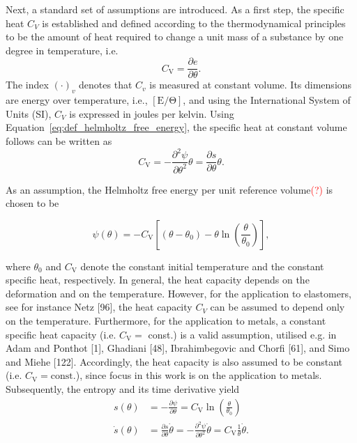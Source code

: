 Next, a standard set of assumptions are introduced.
As a first step, the specific heat \(C_{V}\) is established and defined according to the thermodynamical principles to be the amount of heat required to change a unit mass of a substance by one degree in temperature, i.e.
\begin{equation}
C_{\mathrm{V}}=\frac{\partial e}{\partial \theta}.
\end{equation}
The index \((\cdot)_{v}\) denotes that \(C_{v}\) is measured at constant volume.
Its dimensions are energy over temperature, i.e., \(\mathrm{[E/\Theta]}\), and using the International System of Units (SI), \(C_{V}\) is expressed in joules per kelvin.
Using Equation~\ref{eq:def_helmholtz_free_energy}, the specific heat at constant volume follows can be written as
\begin{equation}
C_{\mathrm{V}}=-\frac{\partial^{2} \psi}{\partial \theta^{2}} \theta=\frac{\partial s}{\partial \theta} \theta.
\end{equation}

As an assumption, the Helmholtz free energy per unit reference volume\textcolor{red}{(?)} is chosen to be
\begin{highlight}
\begin{equation}
\psi(\theta)=- C_{\mathrm{V}}\left[\left(\theta-\theta_{0}\right)-\theta \ln \left(\frac{\theta}{\theta_{0}}\right)\right],
\end{equation}
\end{highlight}
where \(\theta_{0}\) and \(C_{\mathrm{V}}\) denote the constant initial temperature and the constant specific heat, respectively.
In general, the heat capacity depends on the deformation and on the temperature.
However, for the application to elastomers, see for instance Netz [96], the heat capacity \(C_{V}\) can be assumed to depend only on the temperature.
Furthermore, for the application to metals, a constant specific heat capacity (i.e. \(C_{\mathrm{V}}=\) const.) is a valid assumption, utilised e.g. in Adam and Ponthot [1], Ghadiani [48], Ibrahimbegovic and Chorfi [61], and Simo and Miehe [122].
Accordingly, the heat capacity is also assumed to be constant (i.e. \(C_{\mathrm{V}}= \mathrm{const}\).), since focus in this work is on the application to metals.
Subsequently, the entropy and its time derivative yield
\begin{align}
s(\theta)&=-\frac{\partial \psi}{\partial \theta}=C_{\mathrm{V}} \ln \left(\frac{\theta}{\theta_{0}}\right) \\
\dot{s}(\theta)&=\frac{\partial s}{\partial \theta} \dot{\theta}=-\frac{\partial^{2} \psi}{\partial \theta^{2}} \dot{\theta}=C_{\mathrm{V}} \frac{1}{\theta} \dot{\theta}.
\end{align}


